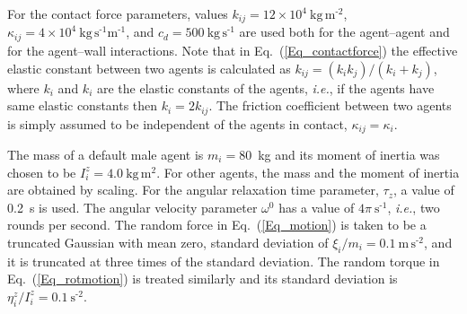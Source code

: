 \documentclass[12pt,a4paper,final,twoside]{stylevk}
\begin{document}
For the contact force parameters, values $k_{ij} = 12 \times 10^4
~\mathrm{ \textrm{kg} \, \textrm{m}^\textrm{-2} }$, $\kappa_{ij} = 4
\times 10^4 ~\mathrm{ \textrm{kg} \, \textrm{s}^\textrm{-1}
  \textrm{m}^\textrm{-1} } $, and $c_d = 500 ~\mathrm{\textrm{kg} \,
  \textrm{s}^\textrm{-1} } $ are used both for the agent--agent and
for the agent--wall interactions.  Note that in
Eq.~(\ref{Eq_contactforce}) the effective elastic constant between two
agents is calculated as $k_{ij} = (k_i k_j)/(k_i+k_j)$, where $k_i$
and $k_i$ are the elastic constants of the agents, \emph{i.e.}, if the
agents have same elastic constants then $k_{i} = 2 k_{ij}$.  The
friction coefficient between two agents is simply assumed to be
independent of the agents in contact, $\kappa_{ij} = \kappa_i$.


The mass of a default male agent is $m_i = 80$~kg and its moment of
inertia was chosen to be $I^z_{i} = 4.0 ~\mathrm{ \textrm{kg} \,
  \textrm{m}^\textrm{2} }$.  For other agents, the mass and the moment
of inertia are obtained by scaling.  For the angular relaxation time
parameter, $\tau_z$, a value of 0.2~s is used.  The angular velocity
parameter $\omega^0$ has a value of $4\pi~\mathrm{
  \textrm{s}^\textrm{-1} } $, \emph{i.e.}, two rounds per second.  The
random force in Eq.~(\ref{Eq_motion}) is taken to be a truncated
Gaussian with mean zero, standard deviation of $ {\xi}_i/m_i = 0.1
~\mathrm{ \textrm{m} \, \textrm{s}^\textrm{-2}}$, and it is truncated
at three times of the standard deviation.  The random torque in
Eq.~(\ref{Eq_rotmotion}) is treated similarly and its standard deviation
is $ {\eta}^z_{i}/ I^z_{i} = 0.1 ~\mathrm{ \textrm{s}^\textrm{-2}}$.

\end{document}
